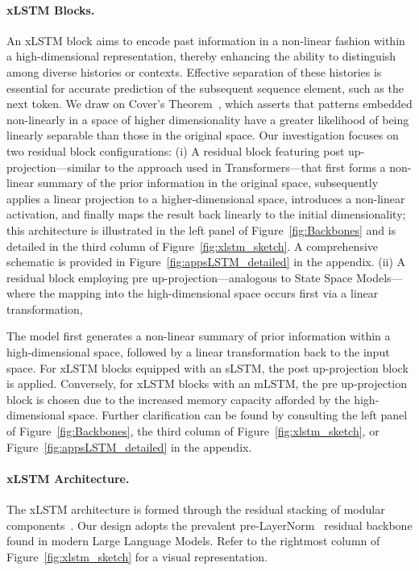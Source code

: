 \paragraph{xLSTM Blocks.}
\label{sec:xLSTMblock}
An xLSTM block aims to encode past information in a non-linear fashion within a high-dimensional representation, thereby enhancing the ability to distinguish among diverse histories or contexts. Effective separation of these histories is essential for accurate prediction of the subsequent sequence element, such as the next token. We draw on Cover’s Theorem~\citep{Cover:65}, which asserts that patterns embedded non-linearly in a space of higher dimensionality have a greater likelihood of being linearly separable than those in the original space. Our investigation focuses on two residual block configurations: (i) A residual block featuring post up-projection—similar to the approach used in Transformers—that first forms a non-linear summary of the prior information in the original space, subsequently applies a linear projection to a higher-dimensional space, introduces a non-linear activation, and finally maps the result back linearly to the initial dimensionality; this architecture is illustrated in the left panel of Figure~\ref{fig:Backbones}
and is detailed in the third column of Figure~\ref{fig:xlstm_sketch}. 
A comprehensive schematic is provided in Figure~\ref{fig:appsLSTM_detailed}
in the appendix. (ii) A residual block employing pre up-projection—analogous to State Space Models—where the mapping into the high-dimensional space occurs first via a linear transformation,

The model first generates a non-linear summary of prior information within a high-dimensional space, followed by a linear transformation back to the input space. For xLSTM blocks equipped with an sLSTM, the post up-projection block is applied. Conversely, for xLSTM blocks with an mLSTM, the pre up-projection block is chosen due to the increased memory capacity afforded by the high-dimensional space. Further clarification can be found by consulting the left panel of Figure~\ref{fig:Backbones}, the third column of Figure~\ref{fig:xlstm_sketch}, or Figure~\ref{fig:appsLSTM_detailed} in the appendix.

\paragraph{xLSTM Architecture. }
\label{sec:xLSTMarchitecure}
The xLSTM architecture is formed through the residual stacking of modular components~\citep{Srivastava:15,He:16}. Our design adopts the prevalent pre-LayerNorm~\citep{Ba:16b} residual backbone found in modern Large Language Models. Refer to the rightmost column of Figure~\ref{fig:xlstm_sketch} for a visual representation.

